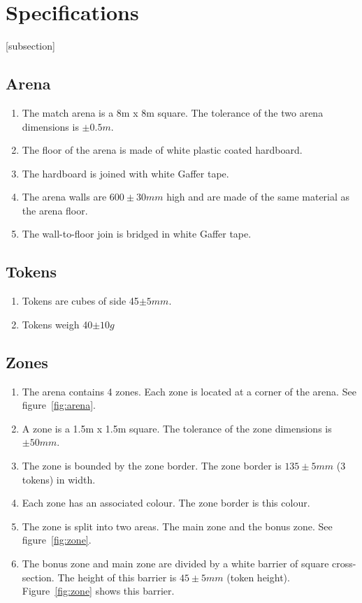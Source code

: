 \section{Specifications}
[subsection]
\newcommand{\rcnii}{\stepcounter{rulei}\arabic{section}.\arabic{subsection}.\arabic{rulei}}
\renewcommand{\labelenumi}{\rcnii}

\subsection{Arena}
\begin{enumerate}
\item The match arena is a 8m x 8m square.  The tolerance of the two arena dimensions is $\pm0.5m$.
\item The floor of the arena is made of white plastic coated hardboard.
\item The hardboard is joined with white Gaffer tape.
\item The arena walls are $600\pm30mm$ high and are made of the same material as the arena floor.
\item The wall-to-floor join is bridged in white Gaffer tape.
\end{enumerate}

\subsection{Tokens}
\label{tokens}

\begin {enumerate} 
\item Tokens are cubes of side 45$\pm5mm$.
\item Tokens weigh 40$\pm10g$
\end {enumerate}

\subsection{Zones}
\begin {enumerate}
\item The arena contains 4 zones.  Each zone is located at a corner of the arena.  See figure~\ref{fig:arena}.
\item A zone is a 1.5m x 1.5m square.  The tolerance of the zone dimensions is $\pm50mm$.
\item The zone is bounded by the zone border.  The zone border is $135\pm5mm$ (3 tokens) in width.
\item Each zone has an associated colour.  The zone border is this colour.
\item The zone is split into two areas.  The main zone and the bonus zone.  See figure~\ref{fig:zone}.
\item The bonus zone and main zone are divided by a white barrier of square cross-section.  The height of this barrier is $45\pm5mm$ (token height).  Figure~\ref{fig:zone} shows this barrier.
\end {enumerate}

